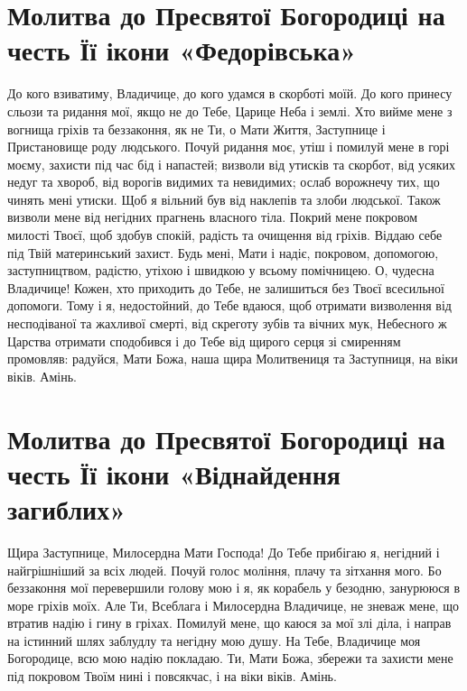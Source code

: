 \documentclass[chapters.tex]{subfiles}
\begin{document}
\section{Молитва до Пресвятої Богородиці на честь Її ікони «Федорівська»}
До кого взиватиму, Владичице, до кого удамся в скорботі моїй. До кого принесу сльози та ридання мої, якщо не до Тебе, Царице Неба і землі. Хто вийме мене з вогнища гріхів та беззаконня, як не Ти, о Мати Життя, Заступнице і Пристановище роду людського. Почуй ридання моє, утіш і помилуй мене в горі моєму, захисти під час бід і напастей; визволи від утисків та скорбот, від усяких недуг та хвороб, від ворогів видимих та невидимих; ослаб ворожнечу тих, що чинять мені утиски. Щоб я вільний був від наклепів та злоби людської. Також визволи мене від негідних прагнень власного тіла. Покрий мене покровом милості Твоєї, щоб здобув спокій, радість та очищення від гріхів. Віддаю себе під Твій материнський захист. Будь мені, Мати і надіє, покровом, допомогою, заступництвом, радістю, утіхою і швидкою у всьому помічницею. О, чудесна Владичице! Кожен, хто приходить до Тебе, не залишиться без Твоєї всесильної допомоги. Тому і я, недостойний, до Тебе вдаюся, щоб отримати визволення від несподіваної та жахливої смерті, від скреготу зубів та вічних мук, Небесного ж Царства отримати сподобився і до Тебе від щирого серця зі смиренням промовляв: радуйся, Мати Божа, наша щира Молитвениця та Заступниця, на віки віків. Амінь.

\section{Молитва до Пресвятої Богородиці на честь Її ікони «Віднайдення загиблих»}
Щира Заступнице, Милосердна Мати Господа! До Тебе прибігаю я, негідний і найгрішніший за всіх людей. Почуй голос моління, плачу та зітхання мого. Бо беззаконня мої перевершили голову мою і я, як корабель у безодню, занурююся в море гріхів моїх. Але Ти, Всеблага і Милосердна Владичице, не зневаж мене, що втратив надію і гину в гріхах. Помилуй мене, що каюся за мої злі діла, і направ на істинний шлях заблудлу та негідну мою душу. На Тебе, Владичице моя Богородице, всю мою надію покладаю. Ти, Мати Божа, збережи та захисти мене під покровом Твоїм нині і повсякчас, і на віки віків. Амінь.
\end{document}
